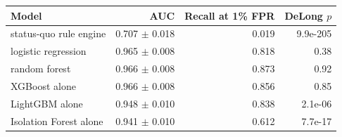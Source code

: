 \begin{tabular}{lrrr}
\toprule
Model & AUC & Recall at 1\% FPR & DeLong $p$ \\
\midrule
status-quo rule engine & 0.707 $\pm$ 0.018 & 0.019 & 9.9e-205 \\
logistic regression & 0.965 $\pm$ 0.008 & 0.818 & 0.38 \\
random forest & 0.966 $\pm$ 0.008 & 0.873 & 0.92 \\
XGBoost alone & 0.966 $\pm$ 0.008 & 0.856 & 0.85 \\
LightGBM alone & 0.948 $\pm$ 0.010 & 0.838 & 2.1e-06 \\
Isolation Forest alone & 0.941 $\pm$ 0.010 & 0.612 & 7.7e-17 \\
\bottomrule
\end{tabular}
